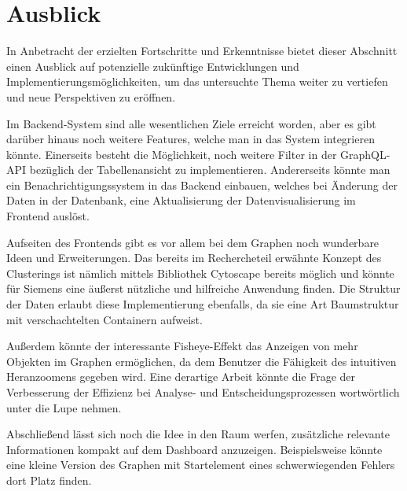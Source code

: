 \section{Ausblick}

In Anbetracht der erzielten Fortschritte und Erkenntnisse bietet dieser Abschnitt einen Ausblick auf potenzielle zukünftige Entwicklungen und Implementierungsmöglichkeiten, um das untersuchte Thema weiter zu vertiefen und neue Perspektiven zu eröffnen.

Im Backend-System sind alle wesentlichen Ziele erreicht worden, aber es gibt darüber hinaus noch weitere Features, welche man in das System integrieren könnte. Einerseits besteht die Möglichkeit, noch weitere Filter in der GraphQL-API bezüglich der Tabellenansicht zu implementieren. Andererseits könnte man ein Benachrichtigungssystem in das Backend einbauen, welches bei Änderung der Daten in der Datenbank, eine Aktualisierung der Datenvisualisierung im Frontend auslöst.  

Aufseiten des Frontends gibt es vor allem bei dem Graphen noch wunderbare Ideen und Erweiterungen. Das bereits im Rechercheteil erwähnte Konzept des Clusterings ist nämlich mittels Bibliothek Cytoscape bereits möglich und könnte für Siemens eine äußerst nützliche und hilfreiche Anwendung finden. Die Struktur der Daten erlaubt diese Implementierung ebenfalls, da sie eine Art Baumstruktur mit verschachtelten Containern aufweist.

Außerdem könnte der interessante Fisheye-Effekt das Anzeigen von mehr Objekten im Graphen ermöglichen, da dem Benutzer die Fähigkeit des intuitiven Heranzoomens gegeben wird. Eine derartige Arbeit könnte die Frage der Verbesserung der Effizienz bei Analyse- und Entscheidungsprozessen wortwörtlich unter die Lupe nehmen.

Abschließend lässt sich noch die Idee in den Raum werfen, zusätzliche relevante Informationen kompakt auf dem Dashboard anzuzeigen. Beispielsweise könnte eine kleine Version des Graphen mit Startelement eines schwerwiegenden Fehlers dort Platz finden.
